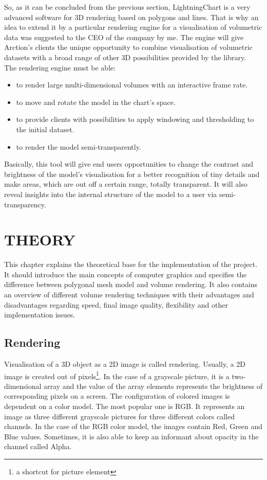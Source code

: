 \documentclass[twoside, english, 11pt]{report}
\begin{document}
So, as it can be concluded from the previous section, LightningChart is a very advanced software for 3D rendering based on polygons and lines. That is why an idea to extend it by a particular rendering engine for a visualisation of volumetric data was suggested to the CEO of the company by me. The engine will give Arction's clients the unique opportunity to combine visualisation of volumetric datasets with a broad range of other 3D possibilities provided by the library. \\

The rendering engine must be able:
\begin{itemize} 
\item to render large multi-dimensional volumes with an interactive frame rate.
\item to move and rotate the model in the chart's space.
\item to provide clients with possibilities to apply windowing and thresholding to the initial dataset.
\item to render the model semi-transparently.
\end{itemize}

Basically, this tool will give end users opportunities to change the contrast and brightness of the model's visualisation for a better recognition of tiny details and make areas, which are out off a certain range, totally transparent. It will also reveal insights into the internal structure of the model to a user via semi-transparency.

\chapter{THEORY}

This chapter explains the theoretical base for the implementation of the project. It should introduce the main concepts of computer graphics and specifies the difference between polygonal mesh model and volume rendering. It also contains an overview of different volume rendering techniques with their advantages and disadvantages regarding speed, final image quality, flexibility and other implementation issues.

\section{Rendering}

Visualisation of a 3D object as a 2D image is called rendering. Usually, a 2D image is created out of pixels\footnote{a shortcut for picture element}. In the case of a grayscale picture, it is a two-dimensional array and the value of the array elements represents the brightness of corresponding pixels on a screen. The configuration of colored images is dependent on a color model. The most popular one is RGB. It represents an image as three different grayscale pictures for three different colors called channels. In the case of the RGB color model, the images contain Red, Green and Blue values. Sometimes, it is also able to keep an informant about opacity in the channel called Alpha.\\
\end{document}
